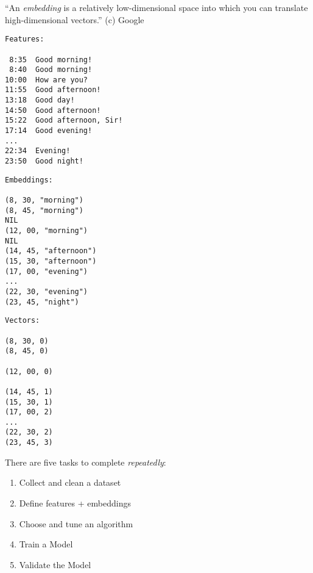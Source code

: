 \documentclass{article}
\begin{document}
\plush{}


``An \emph{embedding} is a relatively low-dimensional space into which you can translate high-dimensional vectors.'' (c) Google

\begin{multicols}{3}
{\scriptsize\begin{verbatim}
Features:

 8:35  Good morning!
 8:40  Good morning!
10:00  How are you?
11:55  Good afternoon!
13:18  Good day!
14:50  Good afternoon!
15:22  Good afternoon, Sir!
17:14  Good evening!
...
22:34  Evening!
23:50  Good night!
\end{verbatim}
}
\par\columnbreak\par
{\scriptsize\begin{verbatim}
Embeddings:

(8, 30, "morning")
(8, 45, "morning")
NIL
(12, 00, "morning")
NIL
(14, 45, "afternoon")
(15, 30, "afternoon")
(17, 00, "evening")
...
(22, 30, "evening")
(23, 45, "night")
\end{verbatim}
}
\par\columnbreak\par
{\scriptsize\begin{verbatim}
Vectors:

(8, 30, 0)
(8, 45, 0)

(12, 00, 0)

(14, 45, 1)
(15, 30, 1)
(17, 00, 2)
...
(22, 30, 2)
(23, 45, 3)
\end{verbatim}
}
\end{multicols}

\plush{}


There are five tasks to complete \emph{repeatedly}:

\begin{enumerate}
  \item Collect and clean a dataset
  \item Define features + embeddings
  \item Choose and tune an algorithm
  \item Train a Model
  \item Validate the Model
\end{enumerate}

\plush{}

\end{document}
